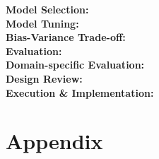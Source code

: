 \documentclass[11pt]{article}
\begin{document}
\noindent \textbf{Model Selection:} \\

\noindent \textbf{Model Tuning:}\\

\noindent \textbf{Bias-Variance Trade-off:}\\

\noindent \textbf{Evaluation:}\\

\noindent \textbf{Domain-specific Evaluation:}\\

\noindent \textbf{Design Review:}\\

\noindent \textbf{Execution \& Implementation:}\\



\newpage
\section{Appendix}

\listoftables
\vspace{5pt}
\end{document}
